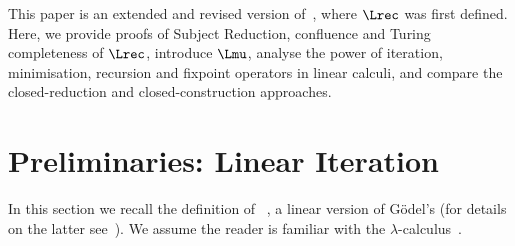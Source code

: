 \documentclass{article}
\begin{document}
This paper is an extended and revised version of~\cite{PPDP2011},
where $\Lrec$ was first defined. Here, we provide proofs of Subject
Reduction, confluence and Turing completeness of $\Lrec$, introduce
$\Lmu$, analyse the power of iteration, minimisation, recursion and
fixpoint operators in linear calculi, and compare the closed-reduction
and closed-construction approaches.






























































































\section{Preliminaries: Linear Iteration}\label{sec:prelim}
In this section we recall the definition of \LLCI~\cite{AlvesS:TCS}, a
linear version of G\"odel's \ST (for details on the latter
see~\cite{GirardJY:prot}). We assume the reader is familiar with the
$\lambda$-calculus~\cite{BarendregtHP:lamcss}.
\end{document}
